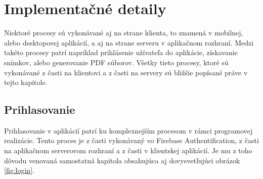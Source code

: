 \section{Implementačné detaily}
Niektoré procesy sú vykonávané aj na strane klienta, to znamená v mobilnej, alebo desktopovej aplikácií, a aj na strane serveru v aplikačnom rozhraní. Medzi takéto procesy patrí napríklad prihlásenie užívateľa do aplikácie, získavanie snímkov, alebo generovanie PDF súborov. Všetky tieto procesy, ktoré sú vykonávané z časti na klientovi a z časti na servery sú bližšie popísané práve v tejto kapitole.

\subsection{Prihlasovanie}
Prihlasovanie v aplikácií patrí ku komplexnejším procesom v rámci programovej realizácie. Tento proces je z časti vykonávaný vo Firebase Authentification, z časti na aplikačnom serverovom rozhraní a z časti v klientskej aplikácií. Je mu z toho dôvodu venovaná samostatná kapitola obsahujúca aj dovysvetľujúci obrázok \ref{fig:login}.

